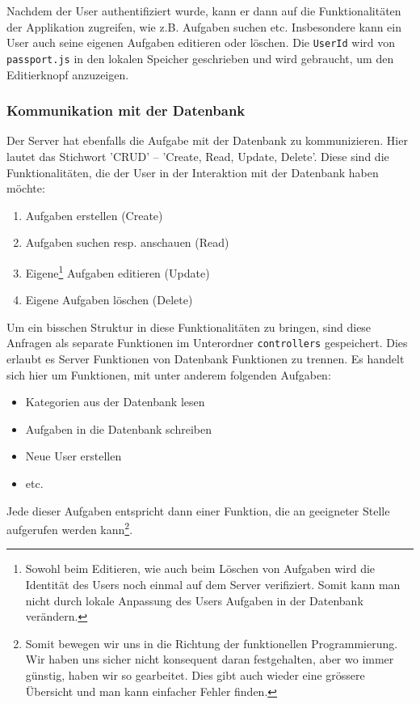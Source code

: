 Nachdem der User authentifiziert wurde, kann er dann auf die Funktionalitäten der Applikation zugreifen, wie z.B. Aufgaben suchen etc. Insbesondere kann ein User auch seine eigenen Aufgaben editieren oder löschen. Die \verb|UserId| wird von \verb|passport.js| in den lokalen Speicher geschrieben und wird gebraucht, um den Editierknopf anzuzeigen. 

\subsubsection{Kommunikation mit der Datenbank}

Der Server hat ebenfalls die Aufgabe mit der Datenbank zu kommunizieren. Hier lautet das Stichwort 'CRUD' -- 'Create, Read, Update, Delete'. Diese sind die Funktionalitäten, die der User in der Interaktion mit der Datenbank haben möchte:
\begin{enumerate}
    \item Aufgaben erstellen (Create)
    \item Aufgaben suchen resp. anschauen (Read)
    \item Eigene\footnote{Sowohl beim Editieren, wie auch beim Löschen von Aufgaben wird die Identität des Users noch einmal auf dem Server verifiziert. Somit kann man nicht durch lokale Anpassung des Users Aufgaben in der Datenbank verändern.} Aufgaben editieren (Update)
    \item Eigene Aufgaben löschen (Delete)
\end{enumerate}

Um ein bisschen Struktur in diese Funktionalitäten zu bringen, sind diese Anfragen als separate Funktionen im Unterordner \verb|controllers| gespeichert. Dies erlaubt es Server Funktionen von Datenbank Funktionen zu trennen. Es handelt sich hier um Funktionen, mit unter anderem folgenden Aufgaben:
\begin{itemize}
    \item Kategorien aus der Datenbank lesen
    \item Aufgaben in die Datenbank schreiben
    \item Neue User erstellen
    \item etc.
\end{itemize}

Jede dieser Aufgaben entspricht dann einer Funktion, die an geeigneter Stelle aufgerufen werden kann\footnote{Somit bewegen wir uns in die Richtung der funktionellen Programmierung. Wir haben uns sicher nicht konsequent daran festgehalten, aber wo immer günstig, haben wir so gearbeitet. Dies gibt auch wieder eine grössere Übersicht und man kann einfacher Fehler finden.}. 

